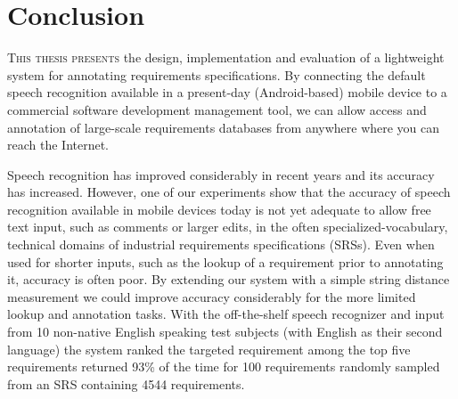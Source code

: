 \chapter{Conclusion}
\lettrine[lines=4, loversize=-0.1, lraise=0.1]{T}{his thesis presents} the design, implementation and evaluation of a lightweight system for annotating requirements specifications. 
By connecting the default speech recognition available in a present-day (Android-based) mobile device to a commercial software development management tool, we can allow access and annotation of large-scale requirements databases from anywhere where you can reach the Internet. 

Speech recognition has improved considerably in recent years and its accuracy has increased. 
However, one of our experiments show that the accuracy of speech recognition available in mobile devices today is not yet adequate to allow free text input, such as comments or larger edits, in the often specialized-vocabulary, technical domains of industrial requirements specifications (SRSs). 
Even when used for shorter inputs, such as the lookup of a requirement prior to annotating it, accuracy is often poor. 
By extending our system with a simple string distance measurement we could improve accuracy considerably for the more limited lookup and annotation tasks.
With the off-the-shelf speech recognizer and input from 10 non-native English speaking test subjects (with English as their second language) the system ranked the targeted requirement among the top five requirements returned 93\% of the time for 100 requirements randomly sampled from an SRS containing 4544 requirements.


